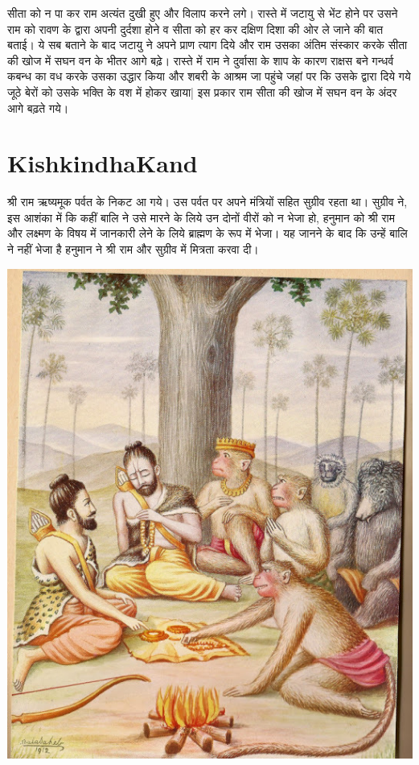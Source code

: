 \documentclass[makeidx, 10pt, oneside, onecolumn, openright, final, svgnames, dvipsnames, extrafontsizes]{memoir}
\begin{document}
सीता को न पा कर राम अत्यंत दुखी हुए और विलाप करने लगे। रास्ते में जटायु से भेंट होने पर उसने राम को रावण के द्वारा अपनी दुर्दशा होने व सीता को हर कर दक्षिण दिशा की ओर ले जाने की बात बताई। ये सब बताने के बाद जटायु ने अपने प्राण त्याग दिये और राम उसका अंतिम संस्कार करके सीता की खोज में सघन वन के भीतर आगे बढ़े। रास्ते में राम ने दुर्वासा के शाप के कारण राक्षस बने गन्धर्व कबन्ध का वध करके उसका उद्धार किया और शबरी के आश्रम जा पहुंचे जहां पर कि उसके द्वारा दिये गये जूठे बेरों को उसके भक्ति के वश में होकर खाया| इस प्रकार राम सीता की खोज में सघन वन के अंदर आगे बढ़ते गये। 


\chapter[किष्किन्धाकाण्ड]{KishkindhaKand}
\thispagestyle{empty}



\hspace{5mm}श्री राम ऋष्यमूक पर्वत के निकट आ गये। उस पर्वत पर अपने मंत्रियों सहित सुग्रीव रहता था। सुग्रीव ने, इस आशंका में कि कहीं बालि ने उसे मारने के लिये उन दोनों वीरों को न भेजा हो, हनुमान को श्री राम और लक्ष्मण के विषय में जानकारी लेने के लिये ब्राह्मण के रूप में भेजा। यह जानने के बाद कि उन्हें बालि ने नहीं भेजा है हनुमान ने श्री राम और सुग्रीव में मित्रता करवा दी। 

 \begin{center}
\includegraphics[scale=0.27]{Rama_Meets_Sugreeva.jpg}
\end{center}
\end{document}
